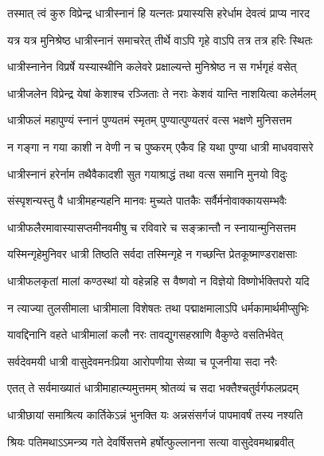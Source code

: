 \twolineshloka
{तस्मात् त्वं कुरु विप्रेन्द्र धात्रीस्नानं हि यत्नतः}
{प्रयास्यसि हरेर्धाम देवत्वं प्राप्य नारद} %

\twolineshloka
{यत्र यत्र मुनिश्रेष्ठ धात्रीस्नानं समाचरेत्}
{तीर्थे वाऽपि गृहे वाऽपि तत्र तत्र हरिः स्थितः} %

\twolineshloka
{धात्रीस्नानेन विप्रर्षे यस्यास्थीनि कलेवरे}
{प्रक्षाल्यन्ते मुनिश्रेष्ठ न स गर्भगृहं वसेत्} %

\twolineshloka
{धात्रीजलेन विप्रेन्द्र येषां केशाश्च रञ्जिताः}
{ते नराः केशवं यान्ति नाशयित्वा कलेर्मलम्} %

\twolineshloka
{धात्रीफलं महापुण्यं स्नानं पुण्यतमं स्मृतम्}
{पुण्यात्पुण्यतरं वत्स भक्षणे मुनिसत्तम} %

\twolineshloka
{न गङ्गा न गया काशी न वेणी न च पुष्करम्}
{एकैव हि यथा पुण्या धात्री माधववासरे} %

\twolineshloka
{धात्रीस्नानं हरेर्नाम तथैवैकादशी सुत}
{गयाश्राद्धं तथा वत्स समानि मुनयो विदुः} %

\twolineshloka
{संस्पृशन्यस्तु वै धात्रीमहन्यहनि मानवः}
{मुच्यते पातकैः सर्वैर्मनोवाक्कायसम्भवैः} %

\twolineshloka
{धात्रीफलैरमावास्यासप्तमीनवमीषु च}
{रविवारे च सङ्क्रान्तौ न स्नायान्मुनिसत्तम} %

\twolineshloka
{यस्मिन्गृहेमुनिवर धात्री तिष्ठति सर्वदा}
{तस्मिन्गृहे न गच्छन्ति प्रेतकूष्माण्डराक्षसाः} %

\twolineshloka
{धात्रीफलकृतां मालां कण्ठस्थां यो वहेन्नहि}
{स वैष्णवो न विज्ञेयो विष्णोर्भक्तिपरो यदि} %

\twolineshloka
{न त्याज्या तुलसीमाला धात्रीमाला विशेषतः}
{तथा पद्माक्षमालाऽपि धर्मकामार्थमीप्सुभिः} %

\twolineshloka
{यावद्दिनानि वहते धात्रीमालां कलौ नरः}
{तावद्युगसहस्राणि वैकुण्ठे वसतिर्भवेत्} %

\twolineshloka
{सर्वदेवमयी धात्री वासुदेवमनःप्रिया}
{आरोपणीया सेव्या च पूजनीया सदा नरैः} %

\twolineshloka
{एतत् ते सर्वमाख्यातं धात्रीमाहात्म्यमुत्तमम्}
{श्रोतव्यं च सदा भक्तैश्चतुर्वर्गफलप्रदम्} %

\twolineshloka
{धात्रीछायां समाश्रित्य कार्तिकेऽन्नं भुनक्ति यः}
{अन्नसंसर्गजं पापमावर्षं तस्य नश्यति} %





\twolineshloka
{श्रियः पतिमथाऽऽमन्त्र्य गते देवर्षिसत्तमे}
{हर्षोत्फुल्लानना सत्या वासुदेवमथाब्रवीत्} %


